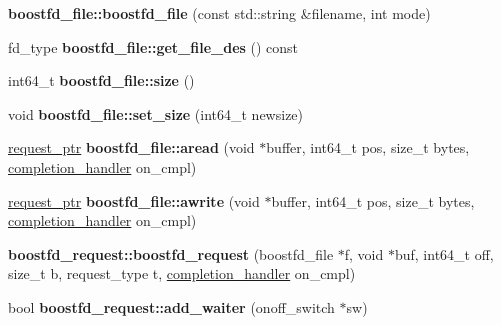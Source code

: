 \begin{CompactItemize}
\item 
\hypertarget{group__iolayer_gd2c7ade3a2d5993ef3586672e285280d}{
\textbf{boostfd\_\-file::boostfd\_\-file} (const std::string \&filename, int mode)}
\label{group__iolayer_gd2c7ade3a2d5993ef3586672e285280d}

\item 
\hypertarget{group__iolayer_g36a68275a86fc79777a51c21c6468ea0}{
fd\_\-type \textbf{boostfd\_\-file::get\_\-file\_\-des} () const }
\label{group__iolayer_g36a68275a86fc79777a51c21c6468ea0}

\item 
\hypertarget{group__iolayer_g17d3a258b26f9a7d2cdb32aa9d7573ec}{
int64\_\-t \textbf{boostfd\_\-file::size} ()}
\label{group__iolayer_g17d3a258b26f9a7d2cdb32aa9d7573ec}

\item 
\hypertarget{group__iolayer_g9e4f5ba259613d4fe8d86c92f1ebdf47}{
void \textbf{boostfd\_\-file::set\_\-size} (int64\_\-t newsize)}
\label{group__iolayer_g9e4f5ba259613d4fe8d86c92f1ebdf47}

\item 
\hypertarget{group__iolayer_gd90802159cb0ab71684504f8e9a0a684}{
\hyperlink{classrequest__ptr}{request\_\-ptr} \textbf{boostfd\_\-file::aread} (void $\ast$buffer, int64\_\-t pos, size\_\-t bytes, \hyperlink{classcompletion__handler}{completion\_\-handler} on\_\-cmpl)}
\label{group__iolayer_gd90802159cb0ab71684504f8e9a0a684}

\item 
\hypertarget{group__iolayer_g2246bdd5301e81a6e7504b04be46c768}{
\hyperlink{classrequest__ptr}{request\_\-ptr} \textbf{boostfd\_\-file::awrite} (void $\ast$buffer, int64\_\-t pos, size\_\-t bytes, \hyperlink{classcompletion__handler}{completion\_\-handler} on\_\-cmpl)}
\label{group__iolayer_g2246bdd5301e81a6e7504b04be46c768}

\item 
\hypertarget{group__iolayer_gfa21a04d9716110f605b9739aad2281c}{
\textbf{boostfd\_\-request::boostfd\_\-request} (boostfd\_\-file $\ast$f, void $\ast$buf, int64\_\-t off, size\_\-t b, request\_\-type t, \hyperlink{classcompletion__handler}{completion\_\-handler} on\_\-cmpl)}
\label{group__iolayer_gfa21a04d9716110f605b9739aad2281c}

\item 
\hypertarget{group__iolayer_ga8f9033492c4dc7596ef77c56fff15d6}{
bool \textbf{boostfd\_\-request::add\_\-waiter} (onoff\_\-switch $\ast$sw)}
\label{group__iolayer_ga8f9033492c4dc7596ef77c56fff15d6}


\end{CompactItemize}
